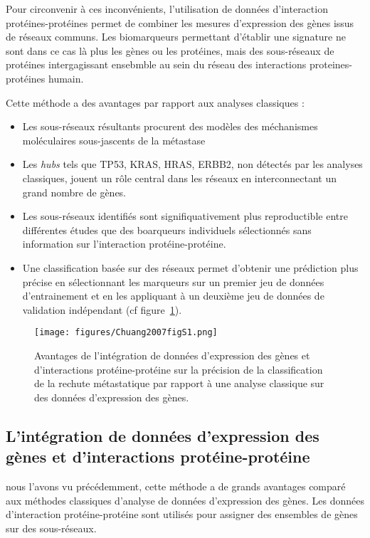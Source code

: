       Pour circonvenir à ces inconvénients, l'utilisation de données d'interaction protéines-protéines permet de combiner les mesures d'expression des gènes issus de réseaux communs.
      Les biomarqueurs permettant d'établir une signature ne sont dans ce cas là plus les gènes ou les protéines, mais des sous-réseaux de protéines intergagissant ensebmble au sein du réseau des interactions proteines-protéines humain.

      Cette méthode a des avantages par rapport aux analyses classiques :
      \begin{itemize}
      \item Les sous-réseaux résultants procurent des modèles des méchanismes moléculaires sous-jascents de la métastase
      \item Les \emph{hubs} tels que \acs{TP53}, \acs{KRAS}, \acs{HRAS}, \acs{ERBB2}, non détectés par les analyses classiques, jouent un rôle central dans les réseaux en interconnectant un grand nombre de gènes.
      \item Les sous-réseaux identifiés sont signifiquativement plus reproductible entre différentes études que des boarqueurs individuels sélectionnés sans information sur l'interaction protéine-protéine.
      \item Une classification basée sur des réseaux permet d'obtenir une prédiction plus précise en sélectionnant les marqueurs sur un premier jeu de données d'entrainement et en les appliquant à un deuxième jeu de données de validation indépendant (cf figure~\ref{fig:Chuang2007figS1}).
      \end{itemize}

      \begin{figure}
        \centering
        \texttt{[image: figures/Chuang2007figS1.png]}
        \caption{Avantages de l'intégration de données d'expression des gènes et d'interactions protéine-protéine sur la précision de la classification de la rechute métastatique par rapport à une analyse classique sur des données d'expression des gènes\citep{Chuang2007}.}
        \label{fig:Chuang2007figS1}
      \end{figure}

    \subsection{\textcolor{mygreen}{L'intégration de données d'expression des gènes et d'interactions protéine-protéine}}
       nous l'avons vu précédemment, cette méthode a de grands avantages comparé aux méthodes classiques d'analyse de données d'expression des gènes.
      Les données d'interaction protéine-protéine sont utilisés pour assigner des ensembles de gènes sur des sous-réseaux.
      
